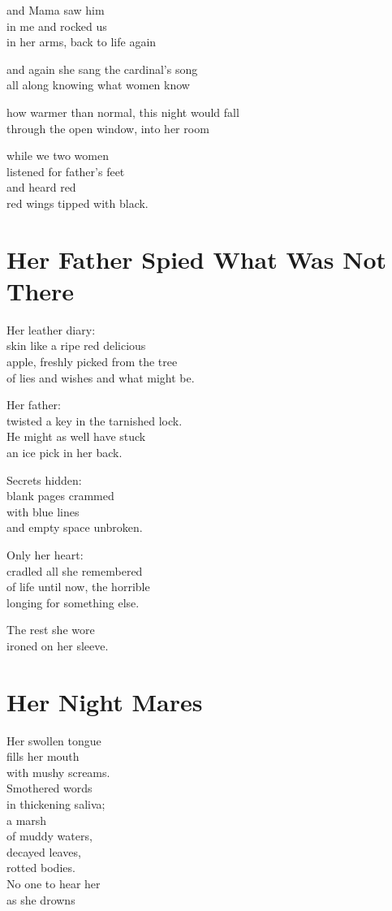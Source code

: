 \documentclass[twoside,10pt]{book}
\begin{document}
and Mama saw him\\
in me and rocked us\\
in her arms, back to life again

and again she sang the cardinal's song\\
all along knowing what women know

how warmer than normal, this night would fall\\
through the open window, into her room

while we two women\\
listened for father's feet\\
and heard red\\
red wings tipped with black.


\clearpage
\section{Her Father Spied What Was Not There}

Her leather diary:\\
skin like a ripe red delicious\\
apple, freshly picked from the tree\\
of lies and wishes and what might be.

Her father:\\
twisted a key in the tarnished lock.\\
He might as well have stuck\\
an ice pick in her back.

Secrets hidden:\\
blank pages crammed\\
with blue lines\\
and empty space unbroken.

Only her heart:\\
cradled all she remembered\\
of life until now, the horrible\\
longing for something else.

The rest she wore\\
ironed on her sleeve.


\clearpage
\section{Her Night Mares}

Her swollen tongue\\
fills her mouth\\
with mushy screams.\\
Smothered words\\
in thickening saliva;\\
a marsh\\
of muddy waters,\\
decayed leaves,\\
rotted bodies.\\
No one to hear her\\
as she drowns
\end{document}
